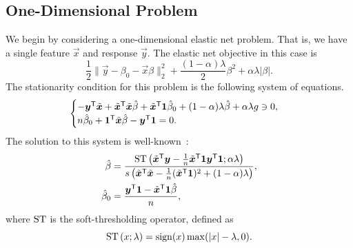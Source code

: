 \subsection{One-Dimensional Problem}

We begin by considering a one-dimensional elastic net problem. That is, we have a single feature \(\vec{x}\) and response \(\vec{y}\). The elastic net objective in this case is
\[
  \frac 1 2 \lVert \vec{y} - \beta_0 - \vec{x} \beta \rVert_2^2 + \frac{(1 - \alpha)\lambda}{2}\beta^2 + \alpha\lambda | \beta |.
\]
The stationarity condition for this problem is the following system of equations.
\[
  \begin{cases}
    -\vec{y}^\T \tilde{\vec{x}} + \tilde{\vec{x}}^\T \tilde{\vec{x}} \hat\beta + \tilde{\vec{x}}^\T \ones \hat\beta_0 + (1 - \alpha) \lambda \hat \beta + \alpha \lambda g \ni 0, \\
    n \hat\beta_0 + \ones^\T \tilde{\vec{x}} \hat\beta -  \vec{y}^\T \ones = 0.
  \end{cases}
\]
The solution to this system is well-known~\parencite{donoho1994}:
\[
  \begin{aligned}
    \label{eq:one-dim-solution}
    \hat\beta   & = \frac{\st{\left(\tilde{\vec{x}}^\T \vec{y} - \frac{1}{n} \tilde{\vec{x}}^\T \ones \vec{y}^\T \ones; \alpha\lambda \right)}}{s\left(\tilde{\vec{x}}^\T \tilde{\vec{x}} - \frac{1}{n}(\tilde{\vec{x}}^\T \ones)^2 + (1 - \alpha) \lambda\right)}, \\
    \hat\beta_0 & = \frac{\vec{y}^\T \ones - \tilde{\vec{x}}^\T \ones\hat\beta}{n},
  \end{aligned}
\]
where \(\operatorname{ST}\) is the soft-thresholding operator, defined as
\[
  \operatorname{ST}{(x; \lambda)} = \operatorname{sign}(x) \max(|x| - \lambda, 0).
\]


